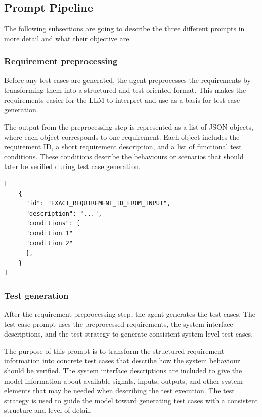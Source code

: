\documentclass[a4paper,12pt]{article}
\begin{document}
\subsection{Prompt Pipeline}
The following subsections are going to describe the three different prompts in more detail and what their objective are.

\subsubsection{Requirement preprocessing}
Before any test cases are generated, the agent preprocesses the requirements by transforming them into a structured and test-oriented format. This makes the requirements easier for the LLM to interpret and use as a basis for test case generation.

The output from the preprocessing step is represented as a list of JSON objects, where each object corresponds to one requirement. Each object includes the requirement ID, a short requirement description, and a list of functional test conditions. These conditions describe the behaviours or scenarios that should later be verified during test case generation.
\begin{lstlisting}[style=pythonstyle, caption={Preprocessed requirement format.}, label={lst:req-parsing}]
[
    {
      "id": "EXACT_REQUIREMENT_ID_FROM_INPUT",
      "description": "...",
      "conditions": [
      "condition 1"
      "condition 2"
      ],
    }
]
\end{lstlisting}

\newpage
\subsubsection{Test generation}
After the requirement preprocessing step, the agent generates the test cases. The test case prompt uses the preprocessed requirements, the system interface descriptions, and the test strategy to generate consistent system-level test cases.

The purpose of this prompt is to transform the structured requirement information into concrete test cases that describe how the system behaviour should be verified. The system interface descriptions are included to give the model information about available signals, inputs, outputs, and other system elements that may be needed when describing the test execution. The test strategy is used to guide the model toward generating test cases with a consistent structure and level of detail.
\end{document}
